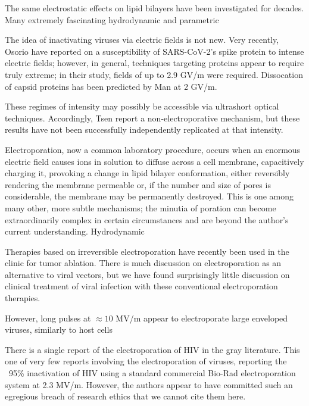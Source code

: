 \documentclass[fleqn,10pt]{paper}
\begin{document}
The same electrostatic effects on lipid bilayers have been investigated for decades. Many extremely fascinating hydrodynamic and parametric 

The idea of inactivating viruses via electric fields is not new. Very recently, Osorio \cite{Receptor2021} have reported on a susceptibility of SARS-CoV-2's spike protein to intense electric fields; however, in general, techniques targeting proteins appear to require truly extreme; in their study, fields of up to 2.9 GV/m were required. Dissocation of capsid proteins has been predicted by Man \cite{Picosecond2016b} at 2 GV/m.

These regimes of intensity may possibly be accessible via ultrashort optical techniques. Accordingly, Tsen \cite{Studies2014} report a non-electroporative mechanism, but these results have not been successfully independently replicated at that intensity\cite{No2011}. 

Electroporation\cite{Electroporation1988}, now a common laboratory procedure, occurs when an enormous electric field causes ions in solution to diffuse across a cell membrane, capacitively charging it, provoking a change in lipid bilayer conformation\cite{Membrane2016}, either reversibly rendering the membrane permeable or, if the number and size of pores is considerable, the membrane may be permanently destroyed. This is one among many other, more subtle mechanisms; the minutia of poration can become extraordinarily complex in certain circumstances and are beyond the author's current understanding\cite{Theoretical2007}. Hydrodynamic

Therapies based on irreversible electroporation\cite{Nonthermal2013}\cite{Lipid2017} have recently been used in the clinic\cite{Irreversible2013} for tumor ablation. There is much discussion on electroporation as an alternative to viral vectors, but we have found surprisingly little discussion on clinical treatment of viral infection with these conventional electroporation therapies.

However, long pulses at $\approx10$ MV/m appear to electroporate large enveloped viruses, similarly to host cells\cite{AC2017}

There is a single report of the electroporation of HIV in the gray literature. This one of very few reports involving the electroporation of viruses, reporting the ~95\% inactivation of HIV using a standard commercial Bio-Rad electroporation system at 2.3 MV/m. However, the authors appear to have committed such an egregious breach of research ethics that we cannot cite them here.
\end{document}
